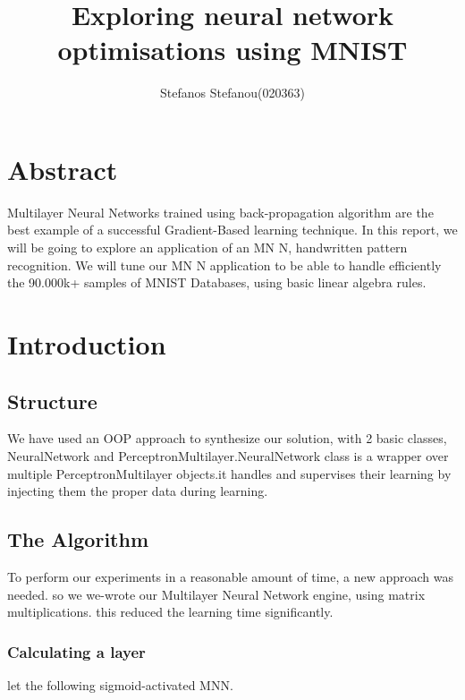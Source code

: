 \documentclass{proc}
\title{Exploring neural network optimisations using MNIST}
\author{Stefanos Stefanou(020363)}
\begin{document}
	\maketitle
	\section{Abstract}
	Multilayer Neural Networks trained using back-propagation algorithm are the best example of a successful
	Gradient-Based learning technique. In this report, we will be going to explore an application of an MN N, handwritten pattern recognition. We will tune our MN N application to be able to handle efficiently the 90.000k+ samples of MNIST Databases, using basic linear algebra rules.
	\section{Introduction}
	\subsection{Structure}
	We have used an OOP approach to synthesize our solution, with 2 basic classes, NeuralNetwork and PerceptronMultilayer.NeuralNetwork class is a wrapper over multiple PerceptronMultilayer objects.it handles and supervises their learning by injecting them the proper data during learning.
	\subsection{The Algorithm}
	To perform our experiments in a reasonable amount of time, a new approach was needed. so we we-wrote our Multilayer Neural Network engine, using matrix multiplications. this reduced the learning time significantly.
	\subsubsection{Calculating a layer}
	let the following sigmoid-activated MNN.
	
\end{document}
